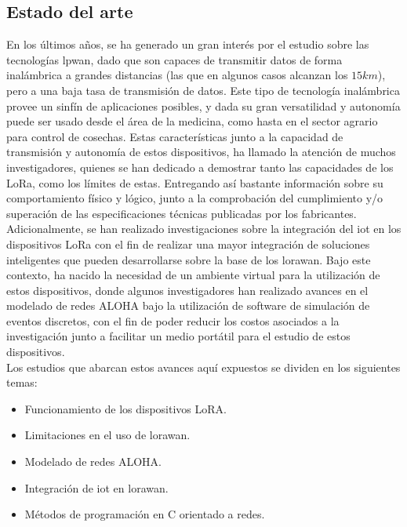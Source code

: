 \begin{justify}
\chapter[Estado del arte]{Estado del arte}
\label{ch:estadodelarte}

En los últimos años, se ha generado un gran interés por el estudio sobre las tecnologías \gls{lpwan}, dado que son capaces de transmitir datos de forma inalámbrica a grandes distancias (las que en algunos casos alcanzan los $15km$), pero a una baja tasa de transmisión de datos. Este tipo de tecnología inalámbrica provee un sinfín de aplicaciones posibles, y dada su gran versatilidad y autonomía puede ser usado desde el área de la medicina, como hasta en el sector agrario para control de cosechas. Estas características junto a la capacidad de transmisión y autonomía de estos dispositivos, ha llamado la atención de muchos investigadores, quienes se han dedicado a demostrar tanto las capacidades de los LoRa, como los límites de estas. Entregando así bastante información sobre su comportamiento físico y lógico, junto a la comprobación del cumplimiento y/o superación de las especificaciones técnicas publicadas por los fabricantes. Adicionalmente, se han realizado investigaciones sobre la integración del \gls{iot} en los dispositivos LoRa con el fin de realizar una mayor integración de soluciones inteligentes que pueden desarrollarse sobre la base de los \gls{lorawan}. Bajo este contexto, ha nacido la necesidad de un ambiente virtual para la utilización de estos dispositivos, donde algunos investigadores han realizado avances en el modelado de redes ALOHA bajo la utilización de software de simulación de eventos discretos, con el fin de poder reducir los costos asociados a la investigación junto a facilitar un medio portátil  para el estudio de estos dispositivos.\\
Los estudios que abarcan estos avances aquí expuestos se dividen en los siguientes temas:
\begin{itemize}
\item Funcionamiento de los dispositivos LoRA.\\
\item Limitaciones en el uso de \gls{lorawan}.\\
\item Modelado de redes ALOHA.\\
\item Integración de \gls{iot} en \gls{lorawan}.\\
\item Métodos de programación en C orientado a redes.\\
\end{itemize} 


\end{justify}
